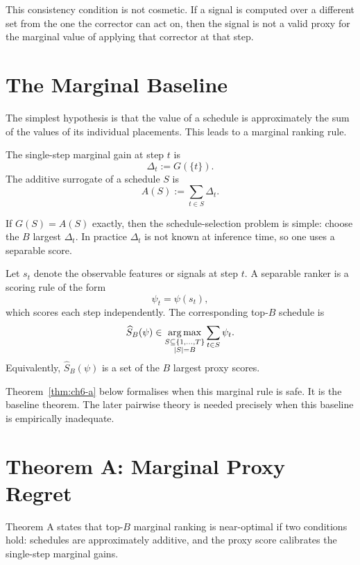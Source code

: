 This consistency condition is not cosmetic. If a signal is computed over a
different set from the one the corrector can act on, then the signal is not a
valid proxy for the marginal value of applying that corrector at that step.

\section{The Marginal Baseline}
\label{sec:ch6-marginal-baseline}

The simplest hypothesis is that the value of a schedule is approximately the
sum of the values of its individual placements. This leads to a marginal
ranking rule.

\begin{definition}
\label{def:ch6-additive}
The single-step marginal gain at step $t$ is
\[
  \Delta_t := G(\{t\}).
\]
The additive surrogate of a schedule $S$ is
\[
  A(S) := \sum_{t\in S}\Delta_t.
\]
\end{definition}

If $G(S)=A(S)$ exactly, then the schedule-selection problem is simple: choose
the $B$ largest $\Delta_t$. In practice $\Delta_t$ is not known at inference
time, so one uses a separable score.

\begin{definition}
\label{def:ch6-separable-ranker}
Let $s_t$ denote the observable features or signals at step $t$. A separable
ranker is a scoring rule of the form
\[
  \psi_t = \psi(s_t),
\]
which scores each step independently. The corresponding top-$B$ schedule is
\[
  \widehat S_B(\psi)
  \in \operatorname*{arg\,max}_{\substack{S\subseteq \{1,\ldots,T\}\\ |S|=B}}
       \sum_{t\in S}\psi_t .
\]
Equivalently, $\widehat S_B(\psi)$ is a set of the $B$ largest proxy scores.
\end{definition}

Theorem~\ref{thm:ch6-a} below formalises when this marginal rule is safe. It is
the baseline theorem. The later pairwise theory is needed precisely when this
baseline is empirically inadequate.

\section{Theorem A: Marginal Proxy Regret}
\label{sec:ch6-theorem-a}

Theorem A states that top-$B$ marginal ranking is near-optimal if two
conditions hold: schedules are approximately additive, and the proxy score
calibrates the single-step marginal gains.

